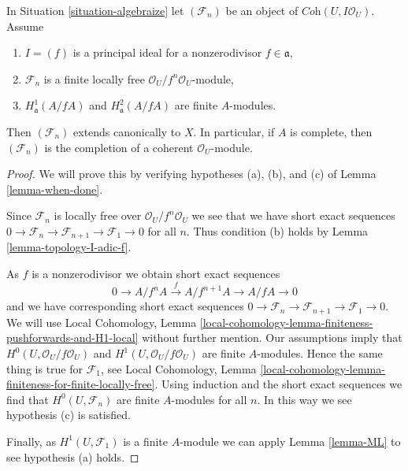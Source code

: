 \begin{lemma}
\label{lemma-algebraization-principal-variant}
In Situation \ref{situation-algebraize} let
$(\mathcal{F}_n)$ be an object of $\textit{Coh}(U, I\mathcal{O}_U)$.
Assume
\begin{enumerate}
\item $I = (f)$ is a principal ideal for a nonzerodivisor $f \in \mathfrak a$,
\item $\mathcal{F}_n$ is a finite locally free
$\mathcal{O}_U/f^n\mathcal{O}_U$-module,
\item $H^1_\mathfrak a(A/fA)$ and $H^2_\mathfrak a(A/fA)$
are finite $A$-modules.
\end{enumerate}
Then $(\mathcal{F}_n)$ extends canonically to $X$. In particular, if $A$
is complete, then $(\mathcal{F}_n)$ is the completion of a coherent
$\mathcal{O}_U$-module.
\end{lemma}

\begin{proof}
We will prove this by verifying hypotheses (a), (b), and (c) of
Lemma \ref{lemma-when-done}.

\medskip\noindent
Since $\mathcal{F}_n$ is locally free over $\mathcal{O}_U/f^n\mathcal{O}_U$
we see that we have short exact sequences
$0 \to \mathcal{F}_n \to \mathcal{F}_{n + 1} \to \mathcal{F}_1 \to 0$
for all $n$. Thus condition (b) holds by Lemma \ref{lemma-topology-I-adic-f}.

\medskip\noindent
As $f$ is a nonzerodivisor we obtain short exact sequences
$$
0 \to A/f^nA \xrightarrow{f} A/f^{n + 1}A \to A/fA \to 0
$$
and we have corresponding short exact sequences
$0 \to \mathcal{F}_n \to \mathcal{F}_{n + 1} \to \mathcal{F}_1 \to 0$.
We will use
Local Cohomology, Lemma
\ref{local-cohomology-lemma-finiteness-pushforwards-and-H1-local}
without further mention. Our assumptions imply that
$H^0(U, \mathcal{O}_U/f\mathcal{O}_U)$ and
$H^1(U, \mathcal{O}_U/f\mathcal{O}_U)$
are finite $A$-modules. Hence the same thing is true for $\mathcal{F}_1$, see
Local Cohomology, Lemma
\ref{local-cohomology-lemma-finiteness-for-finite-locally-free}.
Using induction and the short exact sequences we find that
$H^0(U, \mathcal{F}_n)$ are finite $A$-modules for all $n$.
In this way we see hypothesis (c) is satisfied.

\medskip\noindent
Finally, as $H^1(U, \mathcal{F}_1)$ is a finite $A$-module
we can apply Lemma \ref{lemma-ML} to see hypothesis (a) holds.
\end{proof}

